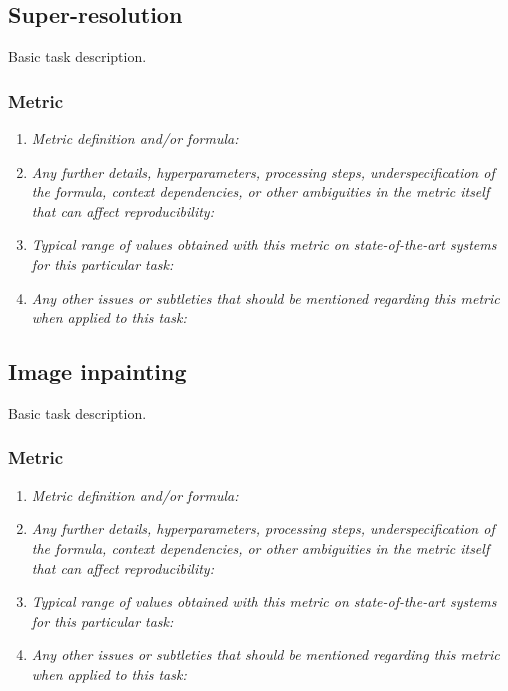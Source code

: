 \documentclass[a4paper,11pt]{article}
\begin{document}
\subsection{Super-resolution} \label{super_resolution}
    Basic task description.
    \subsubsection{Metric}
        \begin{enumerate}[label=\alph*.]
            \item \textit{Metric definition and/or formula:}
            \bigskip
            \item \textit{Any further details, hyperparameters, processing steps, underspecification of the formula, context dependencies, or other ambiguities in the metric itself that can affect reproducibility:}
            \bigskip
            \item \textit{Typical range of values obtained with this metric on state-of-the-art systems for this particular task:}
            \bigskip
            \item \textit{Any other issues or subtleties that should be mentioned regarding this metric when applied to this task:}
            \bigskip
        \end{enumerate}

\subsection{Image inpainting} \label{image_inpainting}
    Basic task description.
    \subsubsection{Metric}
        \begin{enumerate}[label=\alph*.]
            \item \textit{Metric definition and/or formula:}
            \bigskip
            \item \textit{Any further details, hyperparameters, processing steps, underspecification of the formula, context dependencies, or other ambiguities in the metric itself that can affect reproducibility:}
            \bigskip
            \item \textit{Typical range of values obtained with this metric on state-of-the-art systems for this particular task:}
            \bigskip
            \item \textit{Any other issues or subtleties that should be mentioned regarding this metric when applied to this task:}
            \bigskip
        \end{enumerate}
\end{document}
